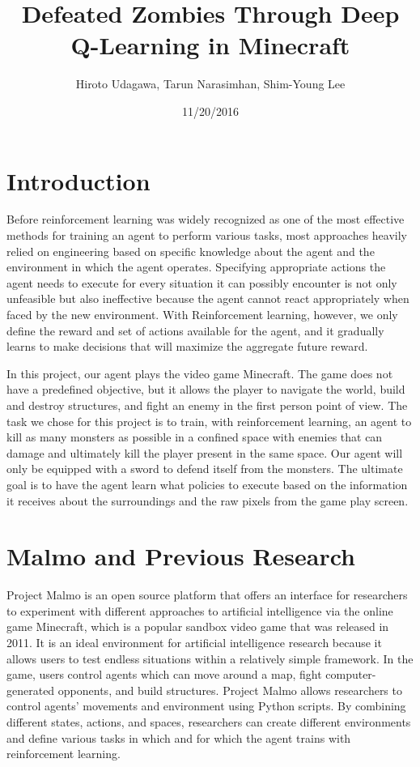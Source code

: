 \documentclass{article}
\title{Defeated Zombies Through Deep Q-Learning in Minecraft}
\author{Hiroto Udagawa, Tarun Narasimhan, Shim-Young Lee}
\date{11/20/2016}
\begin{document}
\maketitle

\section{Introduction}

Before reinforcement learning was widely recognized as one of the most effective methods for training an agent to perform various tasks, most approaches heavily relied on engineering based on specific knowledge about the agent and the environment in which the agent operates. Specifying appropriate actions the agent needs to execute for every situation it can possibly encounter is not only unfeasible but also ineffective because the agent cannot react appropriately when faced by the new environment. With Reinforcement learning, however, we only define the reward and set of actions available for the agent, and it gradually learns to make decisions that will maximize the aggregate future reward.

In this project, our agent plays the video game Minecraft. The game does not have a predefined objective, but it allows the player to navigate the world, build and destroy structures, and fight an enemy in the first person point of view. The task we chose for this project is to train, with reinforcement learning, an agent to kill as many monsters as possible in a confined space with enemies that can damage and ultimately kill the player present in the same space. Our agent will only be equipped with a sword to defend itself from the monsters. The ultimate goal is to have the agent learn what policies to execute based on the information it receives about the surroundings and the raw pixels from the game play screen.

\section{Malmo and Previous Research}

Project Malmo is an open source platform that offers an interface for researchers to experiment with different approaches to artificial intelligence via the online game Minecraft, which is a popular sandbox video game that was released in 2011. It is an ideal environment for artificial intelligence research because it allows users to test endless situations within a relatively simple framework. In the game, users control agents which can move around a map, fight computer-generated opponents, and build structures. Project Malmo allows researchers to control agents' movements and environment using Python scripts. By combining different states, actions, and spaces, researchers can create different environments and define various tasks in which and for which the agent trains with reinforcement learning.
\end{document}

